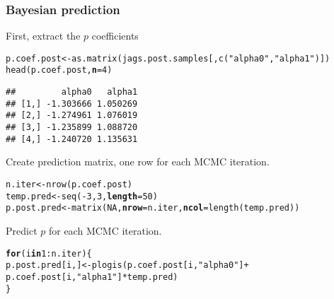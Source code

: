 \documentclass[color=usenames,dvipsnames]{beamer}\usepackage[]{graphicx}\usepackage[]{xcolor}
\makeatletter
\newcommand{\hlnum}[1]{\textcolor[rgb]{0.69,0.494,0}{#1}}%
\newcommand{\hlsng}[1]{\textcolor[rgb]{0.749,0.012,0.012}{#1}}%
\newcommand{\hlopt}[1]{\textcolor[rgb]{0,0,0}{#1}}%
\newcommand{\hldef}[1]{\textcolor[rgb]{0,0,0}{#1}}%
\newcommand{\hlkwa}[1]{\textcolor[rgb]{0,0,0}{\textbf{#1}}}%
\newcommand{\hlkwb}[1]{\textcolor[rgb]{0,0.341,0.682}{#1}}%
\newcommand{\hlkwc}[1]{\textcolor[rgb]{0,0,0}{\textbf{#1}}}%
\newcommand{\hlkwd}[1]{\textcolor[rgb]{0.004,0.004,0.506}{#1}}%
\newenvironment{kframe}{%
 \def\at@end@of@kframe{}%
 \ifinner\ifhmode%
  \def\at@end@of@kframe{\end{minipage}}%
  \begin{minipage}{\columnwidth}%
 \fi\fi%
 \def\FrameCommand##1{\hskip\@totalleftmargin \hskip-\fboxsep
 \colorbox{shadecolor}{##1}\hskip-\fboxsep
     \hskip-\linewidth \hskip-\@totalleftmargin \hskip\columnwidth}%
 \MakeFramed {\advance\hsize-\width
   \@totalleftmargin\z@ \linewidth\hsize
   \@setminipage}}%
 {\par\unskip\endMakeFramed%
 \at@end@of@kframe}
\newenvironment{knitrout}{}{} %
\newcommand{\inr}[1]{\colorbox{inlinecolor}{\texttt{#1}}}
\makeatother
\begin{document}
\begin{frame}[fragile]
  \frametitle{Bayesian prediction}
  \small
  First, extract the $p$ coefficients
  \vspace{-6pt}
\begin{knitrout}\scriptsize
{}\color{fgcolor}\begin{kframe}
\begin{alltt}
\hldef{p.coef.post} \hlkwb{<-} \hlkwd{as.matrix}\hldef{(jags.post.samples[,}\hlkwd{c}\hldef{(}\hlsng{"alpha0"}\hldef{,}\hlsng{"alpha1"}\hldef{)])}
\hlkwd{head}\hldef{(p.coef.post,} \hlkwc{n}\hldef{=}\hlnum{4}\hldef{)}
\end{alltt}
\begin{verbatim}
##         alpha0   alpha1
## [1,] -1.303666 1.050269
## [2,] -1.274961 1.076019
## [3,] -1.235899 1.088720
## [4,] -1.240720 1.135631
\end{verbatim}
\end{kframe}
\end{knitrout}
  \pause
  \vfill
  Create prediction matrix, one row for each MCMC iteration.
  \vspace{-6pt}
\begin{knitrout}\scriptsize
{}\color{fgcolor}\begin{kframe}
\begin{alltt}
\hldef{n.iter} \hlkwb{<-} \hlkwd{nrow}\hldef{(p.coef.post)}
\hldef{temp.pred} \hlkwb{<-} \hlkwd{seq}\hldef{(}\hlopt{-}\hlnum{3}\hldef{,} \hlnum{3}\hldef{,} \hlkwc{length}\hldef{=}\hlnum{50}\hldef{)}
\hldef{p.post.pred} \hlkwb{<-} \hlkwd{matrix}\hldef{(}\hlnum{NA}\hldef{,} \hlkwc{nrow}\hldef{=n.iter,} \hlkwc{ncol}\hldef{=}\hlkwd{length}\hldef{(temp.pred))}
\end{alltt}
\end{kframe}
\end{knitrout}
  \pause
  \vfill
  Predict $p$ for each MCMC iteration.
  \vspace{-6pt}
\begin{knitrout}\scriptsize
{}\color{fgcolor}\begin{kframe}
\begin{alltt}
\hlkwa{for}\hldef{(i} \hlkwa{in} \hlnum{1}\hlopt{:}\hldef{n.iter) \{}
    \hldef{p.post.pred[i,]} \hlkwb{<-} \hlkwd{plogis}\hldef{(p.coef.post[i,}\hlsng{"alpha0"}\hldef{]} \hlopt{+}
                              \hldef{p.coef.post[i,}\hlsng{"alpha1"}\hldef{]}\hlopt{*}\hldef{temp.pred)}
\hldef{\}}
\end{alltt}
\end{kframe}
\end{knitrout}
\end{frame}
\end{document}
